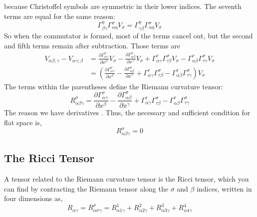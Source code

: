because Christoffel symbols are symmetric in their lower indices. The seventh terms are equal for the same reason:
$$\Gamma^{\eta}_{\beta \gamma}\Gamma^{\sigma}_{\alpha \eta}V_{\sigma} = \Gamma^{\eta}_{\gamma \beta}\Gamma^{\sigma}_{\alpha \eta}V_{\sigma}$$
So when the commutator is formed, most of the terms cancel out, but the second and fifth terms remain after subtraction. Those terms are
\begin{equation}
\begin{split}
V_{\alpha \beta ; \gamma} - V_{\alpha \gamma ; \beta} & = \frac{\partial \Gamma^{\sigma}_{\alpha \gamma}}{\partial x^{\beta}}V_{\sigma} - \frac{\partial \Gamma^{\sigma}_{\alpha \beta}}{\partial x^{\gamma}}V_{\sigma} + \Gamma^{\tau}_{\alpha \gamma} \Gamma^{\sigma}_{\tau \beta}V_{\sigma} - \Gamma^{\tau}_{\alpha \beta} \Gamma^{\sigma}_{\tau \gamma}V_{\sigma} \\
& = \left( \frac{\partial \Gamma^{\sigma}_{\alpha \gamma}}{\partial x^{\beta}} - \frac{\partial \Gamma^{\sigma}_{\alpha \beta}}{\partial x^{\gamma}} + \Gamma^{\tau}_{\alpha \gamma} \Gamma^{\sigma}_{\tau \beta} - \Gamma^{\tau}_{\alpha \beta} \Gamma^{\sigma}_{\tau \gamma} \right) V_{\sigma}
\end{split}
\end{equation}
The terms within the parentheses define the Riemann curvature tensor:
\begin{equation}
R^{\sigma}_{\alpha \beta \gamma} = \frac{\partial \Gamma^{\sigma}_{\alpha \gamma}}{\partial x^{\beta}} - \frac{\partial \Gamma^{\sigma}_{\alpha \beta}}{\partial x^{\gamma}} + \Gamma^{\tau}_{\alpha \gamma} \Gamma^{\sigma}_{\tau \beta} - \Gamma^{\tau}_{\alpha \beta} \Gamma^{\sigma}_{\tau \gamma}
\end{equation}
The reason we have derivatives . Thus, the necessary and sufficient condition for flat space is,
\begin{equation}
R^{\sigma}_{\alpha \beta \gamma} = 0
\end{equation}
\subsection{The Ricci Tensor}
A tensor related to the Riemann curvature tensor is the Ricci tensor, which you can find by contracting the Riemann tensor along the $\sigma$ and $\beta$ indices, written in four dimensions as,
\begin{equation}
R_{\alpha \gamma} = R^{\sigma}_{\alpha \sigma \gamma} = R^{1}_{\alpha 1 \gamma}	+ R^{2}_{\alpha 2 \gamma} + R^{3}_{\alpha 3 \gamma} + R^{4}_{\alpha 4 \gamma}
\end{equation}
